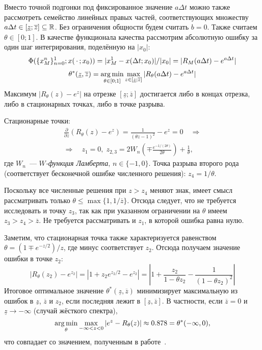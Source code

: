 Вместо точной подгонки под фиксированное значение $ a \Delta t $
можно также рассмотреть семейство линейных правых частей,
соответствующих множеству $ a \Delta t \in [\underline{z}; \overline{z}] \subseteq \mathbb{R} $.
Без ограничения общности будем считать $ b = 0 $.
Также считаем $ \theta \in [0;1] $.
В качестве функционала качества рассмотрим абсолютную ошибку за один шаг интегрирования,
поделённую на $ |x_0| $:
\[
    \Phi(\{ x_M^n \}_{n=0}^1; x(\,\cdot\,; x_0)) = |x^1_M - x(\Delta t; x_0)| / |x_0| = |R_M(a \Delta t) - e^{a \Delta t}|
\]
\begin{equation}
    \label{eq:one_dimensional_linear_system:optimal_theta_for_stiff_systems}
    \theta^*(\underline{z}, \overline{z}) = \operatorname*{\arg\min}_{\theta \in [0;1]}
    \max_{z \in [\underline{z}; \overline{z}]} |R_\theta(a \Delta t) - e^{a \Delta t}|
\end{equation}
Максимум $ |R_\theta(z) - e^z| $ на отрезке $ [\underline{z}; \overline{z}] $ достигается либо в концах отрезка,
либо в стационарных точках, либо в точке разрыва.

Стационарные точки:
\begin{multline*}
    \frac{\partial}{\partial z} (R_\theta(z) - e^z) = \frac{1}{(\theta z - 1)^2} - e^z = 0 \quad \Longrightarrow \\
    \Longrightarrow \quad z_1 = 0, \;
    z_{2,3} = 2 W_n \left( \mp \frac{e^{-1 / (2 \theta)}}{2 \theta} \right) + \frac{1}{\theta},
\end{multline*}
где $ W_n $~--- \emph{$ W $-функция Ламберта}, $ n \in \{ -1, 0 \} $.
Точка разрыва второго рода (соответствует бесконечной ошибке численного решения): $ z_4 = 1/\theta $.

Поскольку все численные решения при $ z > z_4 $ меняют знак,
имеет смысл рассматривать только $ \theta \leqslant \max \{ 1, 1/\overline{z} \} $.
Отсюда следует, что не требуется исследовать и точку $ z_3 $,
так как при указанном ограничении на $ \theta $ имеем $ z_3 > z_4 > \overline{z} $.
Не требуется рассматривать и $ z_1 $, в которой ошибка равна нулю.

Заметим, что стационарная точка также характеризуется равенством
$ \theta = (1 \mp e^{-z/2}) / z $, где минус соответствует $ z_2 $.
Отсюда получаем значение ошибки в точке $ z_2 $:
\[
    |R_\theta(z_2) - e^{z_2}| = |1 + z_2 e^{z_2/2} - e^{z_2}| =
    \left|1 + \frac{z_2}{1 - \theta z_2} - \frac{1}{(1 - \theta z_2)^2} \right|
\]
Итоговое оптимальное значение $ \theta^*(\underline{z}, \overline{z}) $
минимизирует максимальную из ошибок в $ \underline{z} $, $ \overline{z} $ и
$ z_2 $, если последняя лежит в $ [\underline{z}, \overline{z}] $.
В частности, если $ \overline{z} = 0 $ и $ \underline{z} \to -\infty $ (случай жёсткого спектра),
\[
    \operatorname*{\arg\min}_\theta \max_{- \infty < z < 0} | e^z - R_\theta(z) | \approx 0.878 = \theta^*(-\infty, 0),
\]
что совпадает со значением, полученным в работе~\cite{liniger1969global_accuracy}.

